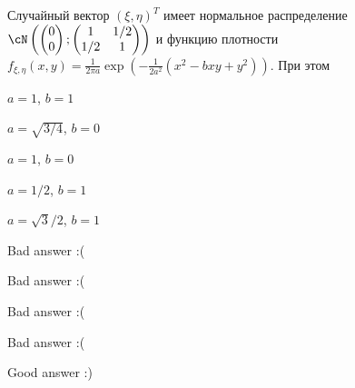
\begin{question}
Случайный вектор \((\xi, \eta)^T\) имеет нормальное распределение
\(\cN \left( \begin{pmatrix} 0 \\ 0 \end{pmatrix}; \begin{pmatrix} 1 & 1/2 \\ 1/2 & 1 \end{pmatrix} \right)\)
и функцию плотности
\(f_{\xi, \eta}(x, y) = \frac{1}{2\pi a} \exp\left(-\frac{1}{2a^2}(x^2-bxy+y^2) \right)\).
При этом
\begin{answerlist}
  \item \(a=1\), \(b=1\)
  \item \(a=\sqrt{3/4}\), \(b=0\)
  \item \(a=1\), \(b=0\)
  \item \(a=1/2\), \(b=1\)
  \item \(a=\sqrt{3}/2\), \(b=1\)
\end{answerlist}
\end{question}

\begin{solution}
\begin{answerlist}
  \item Bad answer :(
  \item Bad answer :(
  \item Bad answer :(
  \item Bad answer :(
  \item Good answer :)
\end{answerlist}
\end{solution}

